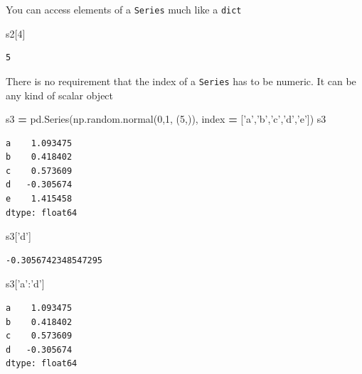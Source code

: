 \documentclass[
  letterpaper,
]{scrbook}
\newenvironment{Shaded}{\begin{snugshade}}{\end{snugshade}}
\newcommand{\DecValTok}[1]{\textcolor[rgb]{0.00,0.00,0.81}{#1}}
\newcommand{\NormalTok}[1]{#1}
\newcommand{\OperatorTok}[1]{\textcolor[rgb]{0.81,0.36,0.00}{\textbf{#1}}}
\newcommand{\StringTok}[1]{\textcolor[rgb]{0.31,0.60,0.02}{#1}}
\begin{document}
You can access elements of a \texttt{Series} much like a \texttt{dict}

\begin{Shaded}
\begin{Highlighting}[]
\NormalTok{s2[}\DecValTok{4}\NormalTok{]}
\end{Highlighting}
\end{Shaded}

\begin{verbatim}
5
\end{verbatim}

There is no requirement that the index of a \texttt{Series} has to be numeric. It can be any kind of scalar object

\begin{Shaded}
\begin{Highlighting}[]
\NormalTok{s3 }\OperatorTok{=}\NormalTok{ pd.Series(np.random.normal(}\DecValTok{0}\NormalTok{,}\DecValTok{1}\NormalTok{, (}\DecValTok{5}\NormalTok{,)), index }\OperatorTok{=}\NormalTok{ [}\StringTok{'a'}\NormalTok{,}\StringTok{'b'}\NormalTok{,}\StringTok{'c'}\NormalTok{,}\StringTok{'d'}\NormalTok{,}\StringTok{'e'}\NormalTok{])}
\NormalTok{s3}
\end{Highlighting}
\end{Shaded}

\begin{verbatim}
a    1.093475
b    0.418402
c    0.573609
d   -0.305674
e    1.415458
dtype: float64
\end{verbatim}

\begin{Shaded}
\begin{Highlighting}[]
\NormalTok{s3[}\StringTok{'d'}\NormalTok{]}
\end{Highlighting}
\end{Shaded}

\begin{verbatim}
-0.3056742348547295
\end{verbatim}

\begin{Shaded}
\begin{Highlighting}[]
\NormalTok{s3[}\StringTok{'a'}\NormalTok{:}\StringTok{'d'}\NormalTok{]}
\end{Highlighting}
\end{Shaded}

\begin{verbatim}
a    1.093475
b    0.418402
c    0.573609
d   -0.305674
dtype: float64
\end{verbatim}
\end{document}
